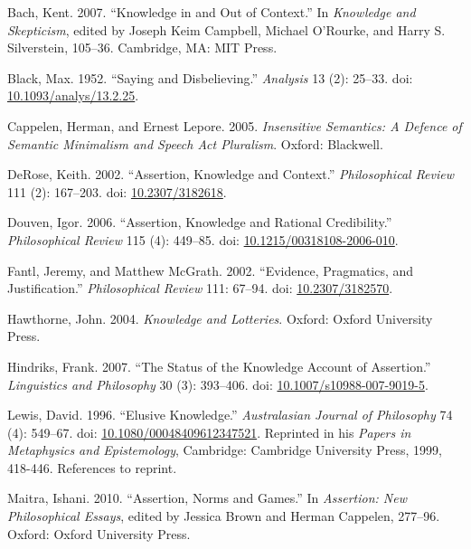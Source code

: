 \documentclass[
  11pt,
  letterpaper,
  DIV=11,
  numbers=noendperiod,
  twoside]{scrartcl}
\newlength{\cslhangindent}
\newenvironment{CSLReferences}[2] %
 {\begin{list}{}{%
  \setlength{\itemindent}{0pt}
  \setlength{\leftmargin}{0pt}
  \setlength{\parsep}{0pt}
  \ifodd #1
   \setlength{\leftmargin}{\cslhangindent}
   \setlength{\itemindent}{-1\cslhangindent}
  \fi
  \setlength{\itemsep}{#2\baselineskip}}}
 {\end{list}}
\begin{document}
\label{refs}
\begin{CSLReferences}{1}{0}
Bach, Kent. 2007. {``Knowledge in and Out of Context.''} In
\emph{Knowledge and Skepticism}, edited by Joseph Keim Campbell, Michael
O'Rourke, and Harry S. Silverstein, 105--36. Cambridge, MA: MIT Press.

Black, Max. 1952. {``Saying and Disbelieving.''} \emph{Analysis} 13 (2):
25--33. doi:
\href{https://doi.org/10.1093/analys/13.2.25}{10.1093/analys/13.2.25}.

Cappelen, Herman, and Ernest Lepore. 2005. \emph{Insensitive Semantics:
A Defence of Semantic Minimalism and Speech Act Pluralism}. Oxford:
Blackwell.

DeRose, Keith. 2002. {``Assertion, Knowledge and Context.''}
\emph{Philosophical Review} 111 (2): 167--203. doi:
\href{https://doi.org/10.2307/3182618}{10.2307/3182618}.

Douven, Igor. 2006. {``Assertion, Knowledge and Rational Credibility.''}
\emph{Philosophical Review} 115 (4): 449--85. doi:
\href{https://doi.org/10.1215/00318108-2006-010}{10.1215/00318108-2006-010}.

Fantl, Jeremy, and Matthew McGrath. 2002. {``Evidence, Pragmatics, and
Justification.''} \emph{Philosophical Review} 111: 67--94. doi:
\href{https://doi.org/10.2307/3182570}{10.2307/3182570}.

Hawthorne, John. 2004. \emph{Knowledge and Lotteries}. Oxford: Oxford
University Press.

Hindriks, Frank. 2007. {``The Status of the Knowledge Account of
Assertion.''} \emph{Linguistics and Philosophy} 30 (3): 393--406. doi:
\href{https://doi.org/10.1007/s10988-007-9019-5}{10.1007/s10988-007-9019-5}.

Lewis, David. 1996. {``Elusive Knowledge.''} \emph{Australasian Journal
of Philosophy} 74 (4): 549--67. doi:
\href{https://doi.org/10.1080/00048409612347521}{10.1080/00048409612347521}.
Reprinted in his \emph{Papers in Metaphysics and Epistemology},
Cambridge: Cambridge University Press, 1999, 418-446. References to
reprint.

Maitra, Ishani. 2010. {``Assertion, Norms and Games.''} In
\emph{Assertion: New Philosophical Essays}, edited by Jessica Brown and
Herman Cappelen, 277--96. Oxford: Oxford University Press.


\end{CSLReferences}
\end{document}
